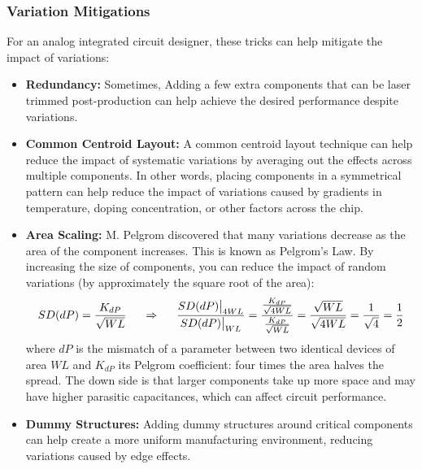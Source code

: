 \subsubsection{Variation Mitigations}
For an analog integrated circuit designer, these tricks can help
mitigate the impact of variations:
\begin{itemize}
  \item \textbf{Redundancy:} Sometimes, Adding a few extra components
    that can be laser trimmed post-production can help achieve the
    desired performance despite variations.
  \item \textbf{Common Centroid Layout:} A common centroid layout
    technique can help reduce the impact of systematic variations
    by averaging out the effects across multiple components.
    In other words, placing components in a symmetrical pattern
    can help reduce the impact of variations caused by gradients
    in temperature, doping concentration, or other factors across
    the chip.
  \item \textbf{Area Scaling:} M. Pelgrom discovered that many
    variations decrease as the area of the component increases.
    This is known as Pelgrom's Law. By increasing the size of
    components, you can reduce the impact of random variations
    (by approximately the square root of the area):
    \[
      SD(dP) = \frac{K_{dP}}{\sqrt{W L}} \hspace{0.5cm} \Rightarrow \hspace{0.5cm}
      \frac{SD(dP)\big|_{4WL}}{SD(dP)\big|_{WL}} = \frac{\frac{K_{dP}}{\sqrt{4WL}}}{\frac{K_{dP}}{\sqrt{WL}}} = \frac{\sqrt{WL}}{\sqrt{4WL}} = \frac{1}{\sqrt{4}} = \frac{1}{2}
    \]
    where \(dP\) is the mismatch of a parameter between two identical devices of area
    \(WL\) and \(K_{dP}\) its Pelgrom coefficient: four times the area halves the
    spread. The down
    side is that larger components take up more space and may
    have higher parasitic capacitances, which can affect circuit
    performance.
  \item \textbf{Dummy Structures:} Adding dummy structures around
    critical components can help create a more uniform manufacturing
    environment, reducing variations caused by edge effects.
\end{itemize}

